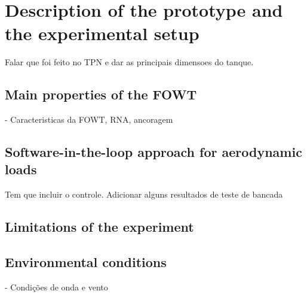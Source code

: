 \section{Description of the prototype and the experimental setup} \label{sec:description_experiment}
Falar que foi feito no TPN e dar as principais dimensoes do tanque.

\subsection{Main properties of the FOWT}
- Caracteristicas da FOWT, RNA, ancoragem

\subsection{Software-in-the-loop approach for aerodynamic loads}
Tem que incluir o controle. Adicionar alguns resultados de teste de bancada

\subsection{Limitations of the experiment}

\subsection{Environmental conditions}
- Condições de onda e vento